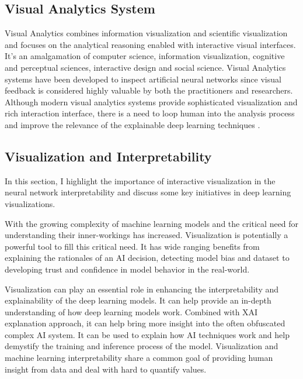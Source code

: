 \subsection{Visual Analytics System}
    
Visual Analytics combines information visualization and scientific visualization and focuses on the analytical reasoning enabled with interactive visual interfaces. It’s an amalgamation of computer science, information visualization, cognitive and perceptual sciences, interactive design and social science. Visual Analytics systems have been developed to inspect artificial neural networks since visual feedback is considered highly valuable by both the practitioners and researchers. Although modern visual analytics systems provide sophisticated visualization and rich interaction interface, there is a need to loop human into the analysis process and improve the relevance of the explainable deep learning techniques \cite{Choo2018}.

\subsection{Visualization and Interpretability}

In this section, I highlight the importance of interactive visualization in the neural network interpretability and discuss some key initiatives in deep learning visualizations. 

With the growing complexity of machine learning models and the critical need for understanding their inner-workings has increased. Visualization is potentially a powerful tool to fill this critical need. It has wide ranging benefits from explaining the rationales of an AI decision, detecting model bias and dataset to developing trust and confidence in model behavior in the real-world.

Visualization can play an essential role in enhancing the interpretability and explainability of the deep learning models. It can help provide an in-depth understanding of how deep learning models work. Combined with XAI explanation approach, it can help bring more insight into the often obfuscated complex AI system. It can be used to explain how AI techniques work and help demystify the training and inference process of the model.
Visualization and machine learning interpretability share a common goal of providing human insight from data and deal with hard to quantify values.

